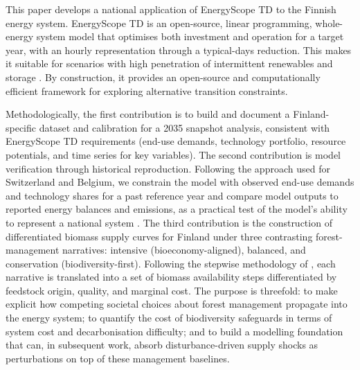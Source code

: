 \documentclass{article}
\begin{document}
This paper develops a national application of EnergyScope TD to the Finnish energy system. EnergyScope TD is an open-source, linear programming, whole-energy system model that optimises both investment and operation for a target year, with an hourly representation through a typical-days reduction. This makes it suitable for scenarios with high penetration of intermittent renewables and storage \citep{limpensEnergyScopeTDNovel2019,limpensEnergyScopePathwayOpensource2024}. By construction, it provides an open-source and computationally efficient framework for exploring alternative transition constraints.

Methodologically, the first contribution is to build and document a Finland-specific dataset and calibration for a 2035 snapshot analysis, consistent with EnergyScope TD requirements (end-use demands, technology portfolio, resource potentials, and time series for key variables). The second contribution is model verification through historical reproduction. Following the approach used for Switzerland and Belgium, we constrain the model with observed end-use demands and technology shares for a past reference year and compare model outputs to reported energy balances and emissions, as a practical test of the model's ability to represent a national system \citep{moretCharacterizationInputUncertainties2017,thiranExploringOptionsFossilfree2025,limpensGeneratingEnergyTransition2021}. The third contribution is the construction of differentiated biomass supply curves for Finland under three contrasting forest-management narratives: intensive (bioeconomy-aligned), balanced, and conservation (biodiversity-first). Following the stepwise methodology of \citet{collaOptimalUseLignocellulosic2022}, each narrative is translated into a set of biomass availability steps differentiated by feedstock origin, quality, and marginal cost. The purpose is threefold: to make explicit how competing societal choices about forest management propagate into the energy system; to quantify the cost of biodiversity safeguards in terms of system cost and decarbonisation difficulty; and to build a modelling foundation that can, in subsequent work, absorb disturbance-driven supply shocks as perturbations on top of these management baselines.
\end{document}
